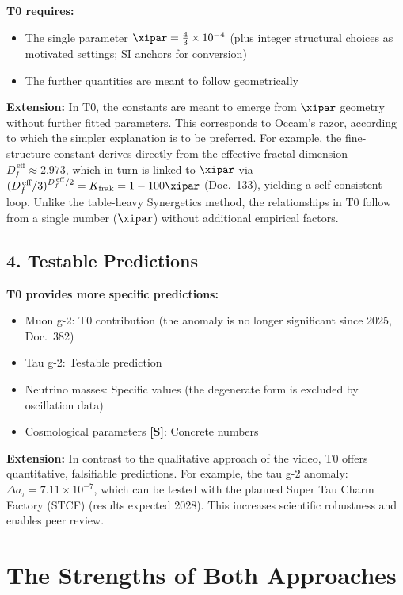 	\textbf{T0 requires:}
	\begin{itemize}
		\item The single parameter $\xipar = \frac{4}{3} \times 10^{-4}$ (plus integer structural choices as motivated settings; SI anchors for conversion)
		\item The further quantities are meant to follow geometrically
	\end{itemize}
	
	\textbf{Extension:} In T0, the constants are meant to emerge from $\xipar$ geometry without further fitted parameters. This corresponds to Occam's razor, according to which the simpler explanation is to be preferred. For example, the fine-structure constant derives directly from the effective fractal dimension $D_f^{\,\text{eff}} \approx 2.973$, which in turn is linked to $\xipar$ via $(D_f^{\,\text{eff}}/3)^{D_f^{\,\text{eff}}/2} = K_{\text{frak}} = 1 - 100\xipar$ (Doc.~133), yielding a self-consistent loop. Unlike the table-heavy Synergetics method, the relationships in T0 follow from a single number ($\xipar$) without additional empirical factors.
	
	\subsection{4. Testable Predictions}
	
	\begin{vorteil}
		\textbf{T0 provides more specific predictions:}
		\begin{itemize}
			\item Muon g-2: T0 contribution (the anomaly is no longer significant since 2025, Doc.~382)
			\item Tau g-2: Testable prediction
			\item Neutrino masses: Specific values (the degenerate form is excluded by oscillation data)
			\item Cosmological parameters \textbf{[S]}: Concrete numbers
		\end{itemize}
		
		\textbf{Extension:} In contrast to the qualitative approach of the video, T0 offers quantitative, falsifiable predictions. For example, the tau g-2 anomaly: $\Delta a_\tau = 7.11 \times 10^{-7}$, which can be tested with the planned Super Tau Charm Factory (STCF) (results expected 2028). This increases scientific robustness and enables peer review.
	\end{vorteil}
	\section{The Strengths of Both Approaches}
	
